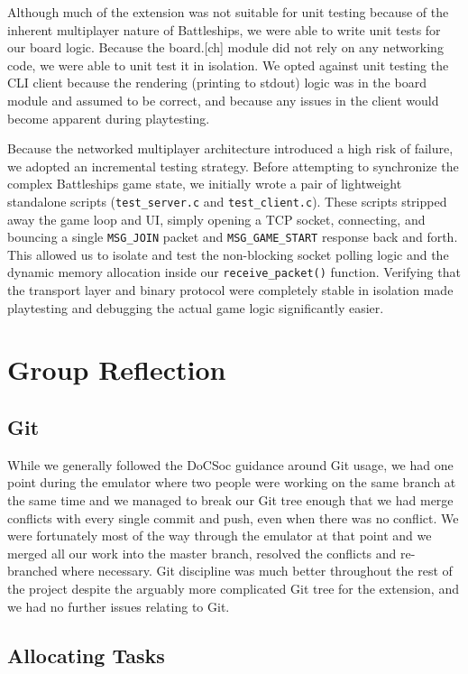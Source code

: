 \documentclass[11pt]{article}
\begin{document}
Although much of the extension was not suitable for unit testing because of the inherent multiplayer nature of Battleships, we were able to write unit tests for our board logic. Because the board.[ch] module did not rely on any networking code, we were able to unit test it in isolation. We opted against unit testing the CLI client because the rendering (printing to stdout) logic was in the board module and assumed to be correct, and because any issues in the client would become apparent during playtesting.

Because the networked multiplayer architecture introduced a high risk of failure, we adopted an incremental testing strategy. Before attempting to synchronize the complex Battleships game state, we initially wrote a pair of lightweight standalone scripts (\texttt{test\_server.c} and \texttt{test\_client.c}). These scripts stripped away the game loop and UI, simply opening a TCP socket, connecting, and bouncing a single \texttt{MSG\_JOIN} packet and \texttt{MSG\_GAME\_START} response back and forth. This allowed us to isolate and test the non-blocking socket polling logic and the dynamic memory allocation inside our \texttt{receive\_packet()} function. Verifying that the transport layer and binary protocol were completely stable in isolation made playtesting and debugging the actual game logic significantly easier.
\section{Group Reflection}

\subsection{Git}

While we generally followed the DoCSoc guidance around Git usage, we had one point during the emulator where two people were working on the same branch at the same time and we managed to break our Git tree enough that we had merge conflicts with every single commit and push, even when there was no conflict. We were fortunately most of the way through the emulator at that point and we merged all our work into the master branch, resolved the conflicts and re-branched where necessary. Git discipline was much better throughout the rest of the project despite the arguably more complicated Git tree for the extension, and we had no further issues relating to Git.

\subsection{Allocating Tasks}
\end{document}
